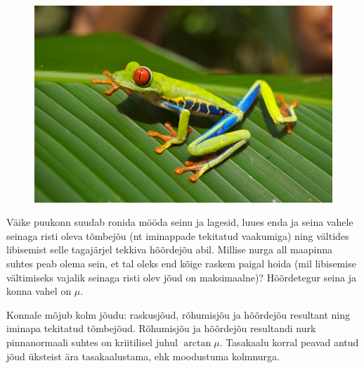 
\begin{figure}
	\vspace{-1.8ex}
	\includegraphics[width=\linewidth]{2010-lahg-09-Red_eyed_tree_frog}
	\vspace{-4ex}
\end{figure}
Väike puukonn suudab ronida mööda seinu ja lagesid, luues enda ja seina vahele 
seinaga risti oleva tõmbejõu (nt iminappade tekitatud vaakumiga) ning vältides libisemist 
selle tagajärjel tekkiva hõõrdejõu abil.
Millise nurga all maapinna suhtes peab olema sein, et tal oleks end kõige raskem paigal hoida 
(mil libisemise vältimiseks vajalik seinaga risti olev jõud on maksimaalne)?
Hõõrdetegur seina ja konna vahel on $\mu$.

\hint
Konnale mõjub kolm jõudu: raskusjõud, rõhumisjõu ja hõõrdejõu resultant ning iminapa tekitatud tõmbejõud. Rõhumisjõu ja hõõrdejõu resultandi nurk pinnanormaali suhtes on kriitilisel juhul $\arctan \mu$. Tasakaalu korral peavad antud jõud üksteist ära tasakaalustama, ehk moodustuma kolmnurga.

